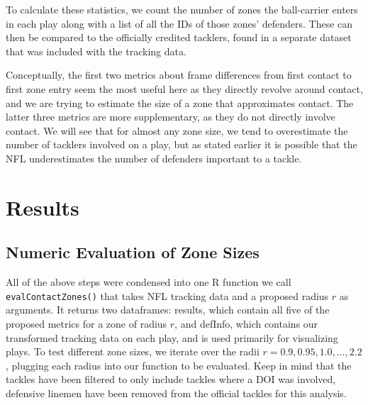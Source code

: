 \documentclass[
  12pt]{article}
\begin{document}
To calculate these statistics, we count the number of zones the
ball-carrier enters in each play along with a list of all the IDs of
those zones' defenders. These can then be compared to the officially
credited tacklers, found in a separate dataset that was included with
the tracking data.

Conceptually, the first two metrics about frame differences from first
contact to first zone entry seem the most useful here as they directly
revolve around contact, and we are trying to estimate the size of a zone
that approximates contact. The latter three metrics are more
supplementary, as they do not directly involve contact. We will see that
for almost any zone size, we tend to overestimate the number of tacklers
involved on a play, but as stated earlier it is possible that the NFL
underestimates the number of defenders important to a tackle.

\section{Results}\label{results}

\subsection{Numeric Evaluation of Zone
Sizes}\label{numeric-evaluation-of-zone-sizes}

All of the above steps were condensed into one R function we call
\texttt{evalContactZones()} that takes NFL tracking data and a proposed
radius \(r\) as arguments. It returns two dataframes: results, which
contain all five of the proposed metrics for a zone of radius \(r\), and
defInfo, which contains our transformed tracking data on each play, and
is used primarily for visualizing plays. To test different zone sizes,
we iterate over the radii \(r = 0.9, 0.95, 1.0, \ldots, 2.2\), plugging
each radius into our function to be evaluated. Keep in mind that the
tackles have been filtered to only include tackles where a DOI was
involved, defensive linemen have been removed from the official tackles
for this analysis.
\end{document}
